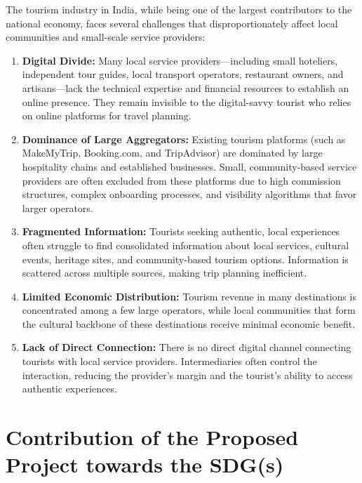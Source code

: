 The tourism industry in India, while being one of the largest contributors to the national economy, faces several challenges that disproportionately affect local communities and small-scale service providers:

\begin{enumerate}[leftmargin=2em]
    \item \textbf{Digital Divide:} Many local service providers---including small hoteliers, independent tour guides, local transport operators, restaurant owners, and artisans---lack the technical expertise and financial resources to establish an online presence. They remain invisible to the digital-savvy tourist who relies on online platforms for travel planning.

    \item \textbf{Dominance of Large Aggregators:} Existing tourism platforms (such as MakeMyTrip, Booking.com, and TripAdvisor) are dominated by large hospitality chains and established businesses. Small, community-based service providers are often excluded from these platforms due to high commission structures, complex onboarding processes, and visibility algorithms that favor larger operators.

    \item \textbf{Fragmented Information:} Tourists seeking authentic, local experiences often struggle to find consolidated information about local services, cultural events, heritage sites, and community-based tourism options. Information is scattered across multiple sources, making trip planning inefficient.

    \item \textbf{Limited Economic Distribution:} Tourism revenue in many destinations is concentrated among a few large operators, while local communities that form the cultural backbone of these destinations receive minimal economic benefit.

    \item \textbf{Lack of Direct Connection:} There is no direct digital channel connecting tourists with local service providers. Intermediaries often control the interaction, reducing the provider's margin and the tourist's ability to access authentic experiences.
\end{enumerate}

\section{Contribution of the Proposed Project towards the SDG(s)}


